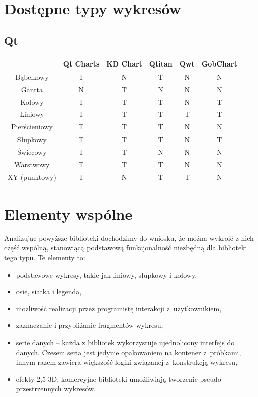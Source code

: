 \documentclass[11pt,twoside,a4paper,final]{llncs}
\begin{document}
\section{Dostępne typy wykresów}
\subsection{Qt}
\begin{tabular}{|c|c|c|c|c|c|}
\hline
&  Qt Charts & KD Chart & Qtitan & Qwt & GobChart\\
\hline
Bąbelkowy & T & N & T & N & N\\
\hline
Gantta & N & T & N & N & N\\
\hline
Kołowy & T & T & T & N & T\\
\hline
Liniowy & T & T & T & T & T\\
\hline
Pierścieniowy & T & T & T & N & N\\
\hline
Słupkowy & T & T & T & N & T\\
\hline
Świecowy & T & T & N & N & N\\
\hline
Warstwowy & T & T & T & N & N\\
\hline
XY (punktowy) & T & N & T & T & N\\
\hline

\end{tabular}


\section{Elementy wspólne}
Analizując powyższe biblioteki dochodzimy do wniosku, że można wykroić z nich część wspólną, stanowiącą podstawową funkcjonalność niezbędną dla biblioteki tego typu. Te elementy to:
\begin{itemize}
\item{podstawowe wykresy, takie jak liniowy, słupkowy i kołowy,}
\item{osie, siatka i legenda,}
\item{możliwość realizacji przez programistę interakcji z~użytkownikiem,}
\item{zaznaczanie i przybliżanie fragmentów wykresu,}
\item{serie danych -- każda z bibliotek wykorzystuje ujednolicony interfejs do danych. Czesem seria jest jedynie opakowaniem na kontener z~próbkami, innym razem zawiera większość logiki związanej z~konstrukcją wykresu,}
\item{efekty 2,5-3D, komercyjne biblioteki umożliwiają tworzenie pseudo-przestrzennych wykresów.}
\end{itemize}
\end{document}
